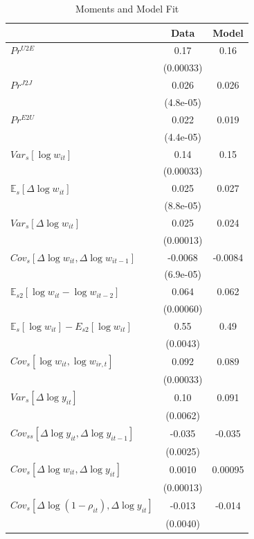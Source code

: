 \documentclass{article}
\begin{document}
\begin{table}[ht]
\centering
\caption{Moments and Model Fit}
\begin{tabular}{@{}lcc@{}}
\toprule
& \textbf{Data} & \textbf{Model} \\
\midrule
\( Pr^{U2E} \) & 0.17 & 0.16 \\
& (0.00033) &  \\
\( Pr^{J2J} \) & 0.026 & 0.026 \\
& (4.8e-05) &  \\
\( Pr^{E2U} \) & 0.022 & 0.019 \\
& (4.4e-05) &  \\
\( Var_{s}[ \log w_{it} ] \) & 0.14 & 0.15 \\
& (0.00033) &  \\
\( \mathbb{E}_{s}[ \Delta \log w_{it} ] \) & 0.025 & 0.027 \\
& (8.8e-05) &  \\
\( Var_{s}[ \Delta \log w_{it} ] \) & 0.025 & 0.024 \\
& (0.00013) &  \\
\( Cov_{s}[\Delta \log w_{it}, \Delta \log w_{it-1}] \) & -0.0068 & -0.0084 \\
& (6.9e-05) &  \\
\( \mathbb{E}_{s2}[ \log w_{it} - \log w_{it-2}] \) & 0.064 & 0.062 \\
& (0.00060) &  \\
\( \mathbb{E}_{s}[ \log w_{it} ] - E_{s2}[ \log w_{it} ] \) & 0.55 & 0.49 \\
& (0.0043) &  \\
\( Cov_{s}[ \log w_{it}, \log w_{ir,t} ] \) & 0.092 & 0.089 \\
& (0.00033) &  \\
\( Var_{s}[ \Delta \log y_{it} ] \) & 0.10 & 0.091 \\
& (0.0062) &  \\
\( Cov_{ss}[ \Delta \log y_{it}, \Delta \log y_{it-1} ] \) & -0.035 & -0.035 \\
& (0.0025) &  \\
\( Cov_{s}[ \Delta \log w_{it}, \Delta \log y_{it} ] \) & 0.0010 & 0.00095 \\
& (0.00013) &  \\
\( Cov_{s}[ \Delta \log (1 - \rho_{it}), \Delta \log y_{it} ] \) & -0.013 & -0.014 \\
& (0.0040) &  \\
\bottomrule
\end{tabular}
\label{tab:moments_model_fit}
\end{table}
\end{document}
